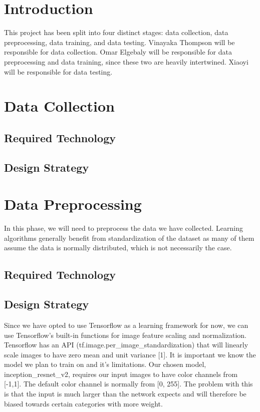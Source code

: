 \documentclass[onecolumn, draftclsnofoot,10pt, compsoc]{IEEEtran}
\begin{document}
\section{Introduction}

This project has been split into four distinct stages: data collection, data preprocessing, data training, and data testing. Vinayaka Thompson will be responsible for data collection. Omar Elgebaly will be responsible for data preprocessing and data training, since these two are heavily intertwined. Xiaoyi will be responsible for data testing. 

\section{Data Collection}

\subsection{Required Technology}

\subsection{Design Strategy}

\section{Data Preprocessing}

In this phase, we will need to preprocess the data we have collected. Learning algorithms generally benefit from standardization of the dataset as many of them assume the data is normally distributed, which is not necessarily the case.

\subsection{Required Technology}

\subsection{Design Strategy}
Since we have opted to use Tensorflow as a learning framework for now, we can use Tensorflow's built-in functions for image feature scaling and normalization. Tensorflow has an API (tf.image.per\_image\_standardization) that will linearly scale images to have zero mean and unit variance [1]. It is important we know the model we plan to train on and it's limitations. Our chosen model, inception\_resnet\_v2, requires our input images to have color channels from [-1,1]. The default color channel is normally from [0, 255]. The problem with this is that the input is much larger than the network expects and will therefore be biased towards certain categories with more weight. 
\end{document}
